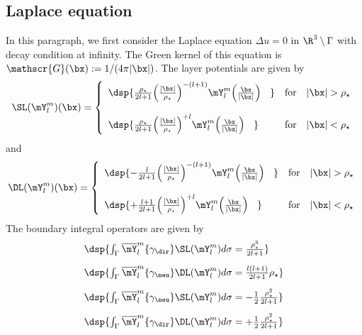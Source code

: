 \documentclass[a4paper,11pt]{article}
\begin{document}
\subsection{Laplace equation}\label{Laplace3D}

In this paragraph, we first consider the Laplace equation $\Delta u = 0$ in $\R^{3}\setminus\Gamma$ with decay
condition at infinity. The Green kernel of this equation is $\mathscr{G}(\bx):= 1/(4\pi\vert\bx\vert)$.
The layer potentials are given by
$$
\SL(\mY_{l}^{m})(\bx) =
\left\{\begin{array}{ll}
\dsp{\frac{\rho_{\star}}{2l+1}\Big(\frac{\vert \bx\vert}{\rho_{\star}}\Big)^{-(l+1)}
\mY_{l}^{m}\Big(\frac{\bx}{\vert\bx\vert}\Big)\phantom{\imath\kappa} }
& \textrm{for}\quad \vert \bx\vert> \rho_{\star}\\[15pt]

\dsp{\frac{\rho_{\star}}{2l+1}\Big(\frac{\vert \bx\vert}{\rho_{\star}}\Big)^{+l}\mY_{l}^{m}
\Big(\frac{\bx}{\vert\bx\vert}\Big)\phantom{\imath\kappa} }
& \textrm{for}\quad \vert \bx\vert< \rho_{\star}
\end{array}\right.
$$
and
$$
\DL(\mY_{l}^{m})(\bx) =
\left\{\begin{array}{ll}
\dsp{-\frac{l}{2l+1}\Big(\frac{\vert \bx\vert}{\rho_{\star}}\Big)^{-(l+1)}\mY_{l}^{m}\Big(\frac{\bx}{\vert\bx\vert}\Big)\phantom{\imath\kappa} }
& \textrm{for}\quad \vert \bx\vert> \rho_{\star}\\[15pt]

\dsp{+\frac{l+1}{2l+1}\Big(\frac{\vert \bx\vert}{\rho_{\star}}\Big)^{+l}\mY_{l}^{m}\Big(\frac{\bx}{\vert\bx\vert}\Big)\phantom{\imath\kappa} }
& \textrm{for}\quad \vert \bx\vert< \rho_{\star}
\end{array}\right.
$$
The boundary integral operators are given by
$$
\begin{array}{ll}
\dsp{ \int_{\Gamma}\overline{\mY}_{l}^{m}\{\gamma_{\dir}\}\SL(\mY_{l}^{m}) d\sigma
= \frac{\rho_{\star}^{3}}{2l+1} }\\[10pt]
\dsp{ \int_{\Gamma}\overline{\mY}_{l}^{m}\{\gamma_{\neu}\}\DL(\mY_{l}^{m}) d\sigma
=  \frac{l(l+1)}{2l+1}\rho_{\star}   }\\[10pt]
\dsp{ \int_{\Gamma}\overline{\mY}_{l}^{m}\{\gamma_{\neu}\}\SL(\mY_{l}^{m}) d\sigma
=  -\frac{1}{2}\frac{\rho_{\star}^{2}}{2l+1} }\\[10pt]
\dsp{ \int_{\Gamma}\overline{\mY}_{l}^{m}\{\gamma_{\dir}\}\DL(\mY_{l}^{m}) d\sigma
=  +\frac{1}{2}\frac{\rho_{\star}^{2}}{2l+1} }\\[10pt]

\end{array}
$$
\end{document}

